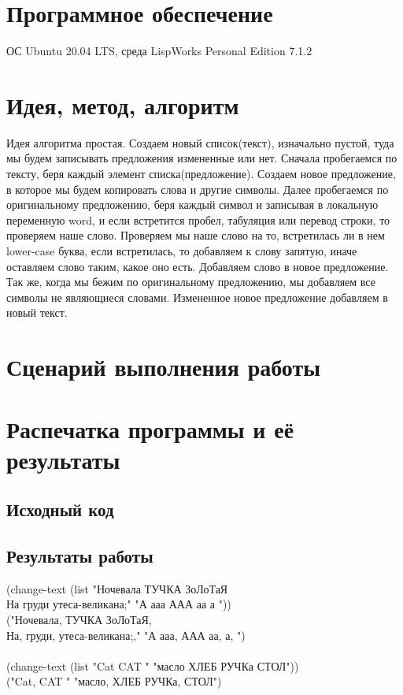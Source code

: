 \documentclass[12pt]{article}
\newcommand{\quotes}[1]{"#1"}
\begin{document}
\section{Программное обеспечение}
{\large ОС Ubuntu 20.04 LTS, среда LispWorks Personal Edition 7.1.2}

\section{Идея, метод, алгоритм}
{\large 
Идея алгоритма простая. Создаем новый список(текст), изначально пустой, туда мы будем записывать 
предложения измененные или нет. Сначала пробегаемся по тексту, беря каждый элемент 
списка(предложение). Создаем новое предложение, в которое мы будем копировать слова и другие
символы. Далее пробегаемся по оригинальному предложению, беря каждый символ и записывая 
в локальную переменную word, и если встретится пробел, табуляция или перевод
строки, то проверяем наше слово. Проверяем мы наше слово на то, встретилась ли в
нем lower-case буква, если встретилась, то добавляем к слову запятую, иначе оставляем
слово таким, какое оно есть. Добавляем слово в новое предложение. Так же, когда мы
бежим по оригинальному предложению, мы добавляем все символы не являющиеся словами.
Измененное новое предложение добавляем в новый текст.}

\section{Сценарий выполнения работы}

\section{Распечатка программы и её результаты}

\subsection{Исходный код}


\subsection{Результаты работы}
% 

{\large 
(change-text (list \quotes{Ночевала ТУЧКА ЗоЛоТаЯ \\
На груди утеса-великана;} \quotes{А ааа ААА аа     а  })) \\
(\quotes{Ночевала, ТУЧКА ЗоЛоТаЯ, \\
На, груди, утеса-великана;,} \quotes{А ааа, ААА аа,     а,  }) \\
\\
(change-text (list \quotes{Cat  CAT } \quotes{масло ХЛЕБ РУЧКа    СТОЛ})) \\
(\quotes{Cat,  CAT } \quotes{масло, ХЛЕБ РУЧКа,    СТОЛ}) \\
}
\end{document}
